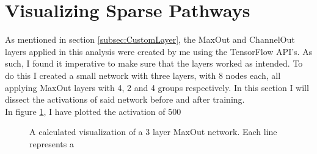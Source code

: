 \section{Visualizing Sparse Pathways}
As mentioned in section \ref{subsec:CustomLayer}, the MaxOut and ChannelOut layers applied in this 
analysis were created by me using the TensorFlow \ac{API}'s. As such, I found it imperative to make
sure that the layers worked as intended. To do this I created a small network with three layers, with 8 
nodes each, all applying MaxOut layers with 4, 2 and 4 groups respectively. In this section I will 
dissect the activations of said network before and after training.
\\
In figure \ref{fig:BTraining}, I have plotted the activation of 500
\begin{figure}
    \caption{A calculated visualization of a 3 layer MaxOut network. Each line represents a 
    }
    \label{fig:BTraining}
\end{figure}
